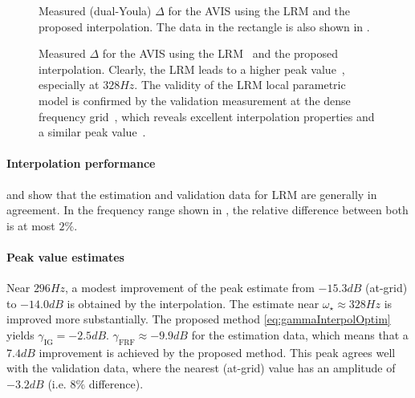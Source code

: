 \begin{figure}
 \centering
    \setlength{\figurewidth}{0.75\columnwidth}
    \setlength{\figureheight}{0.68\figurewidth}
 \caption{Measured (dual-Youla) $\Delta$ for the \gls{AVIS} using the \gls{LRM} and the proposed interpolation. The data in the rectangle is also shown in .}
\label{fig:avisMeas}
\end{figure}

\begin{figure}
 \centering
    \setlength{\figurewidth}{0.75\columnwidth}
    \setlength{\figureheight}{0.68\figurewidth}
   
 \caption{Measured $\Delta$ for the \gls{AVIS} using the \gls{LRM}~ and the proposed interpolation. Clearly, the \gls{LRM} leads to a higher peak value~, especially at $328\unit{Hz}$. The validity of the LRM local parametric model is confirmed by the validation measurement at the dense frequency grid~, which reveals excellent interpolation properties and a similar peak value~.}
\label{fig:avisMeasZoom}
\end{figure}

\vspace{-2em}
\paragraph*{Interpolation performance}
\label{sec:avis-interpol}
 and  show that the estimation and validation data for \gls{LRM} are generally in agreement.
In the frequency range shown in , the relative difference between both is at most $2\%$.

\vspace{-2em}
\paragraph*{Peak value estimates}
\label{sec:avis-peak-value}
Near $296\unit{Hz}$, a modest improvement of the peak estimate from $-15.3 \unit{dB}$ (at-grid) to $-14.0 \unit{dB}$ is obtained by the interpolation.
The estimate near $\omega_{\star} \approx 328\unit{Hz}$ is improved more substantially.
The proposed method \eqref{eq:gammaInterpolOptim} yields $\gamma_{\mathrm{IG}}=-2.5\unit{dB}$.
$\gamma_{\mathrm{FRF}}\approx -9.9\unit{dB}$ for the estimation data, which means that a $7.4\unit{dB}$ improvement is achieved by the proposed method.
This peak agrees well with the validation data, where the nearest (at-grid) value has an amplitude of $-3.2\unit{dB}$ (i.e. $8\%$ difference).

